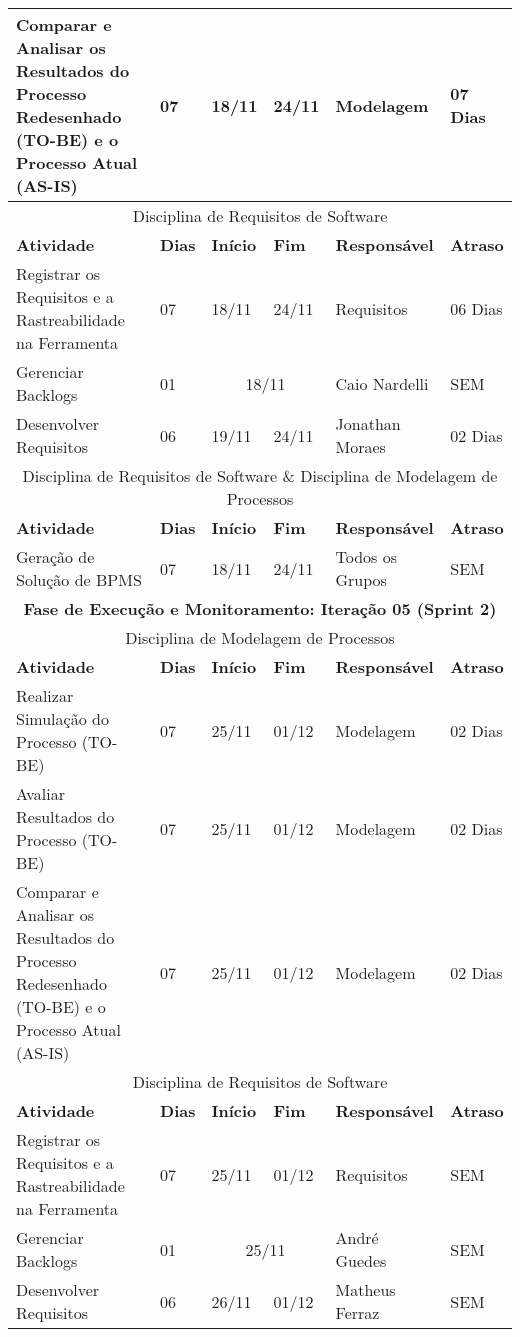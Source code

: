 \begin{center}
	\begin{tabular}{|m{10cm}|m{1cm}|m{1cm}|m{1cm}|m{4cm}|m{2cm}|}
	\hline
	Comparar e Analisar os Resultados do Processo Redesenhado (TO-BE) e o Processo Atual (AS-IS) & 07 & 18/11 & 24/11 & Modelagem & 07 Dias \\ \hline
	\multicolumn{6}{|c|}{Disciplina de Requisitos de Software} \\
	\hline
	\textbf{Atividade} & \textbf{Dias} & \textbf{Início} & \textbf{Fim} & \textbf{Responsável} & \textbf{Atraso} \\ \hline
	Registrar os Requisitos e a Rastreabilidade na Ferramenta & 07 & 18/11 & 24/11 & Requisitos & 06 Dias \\ \hline
	Gerenciar Backlogs & 01 & \multicolumn{2}{c|}{18/11} & Caio Nardelli & SEM \\ \hline
	Desenvolver Requisitos & 06 & 19/11 & 24/11 & Jonathan Moraes & 02 Dias \\ \hline
	\multicolumn{6}{|c|}{Disciplina de Requisitos de Software \& Disciplina de Modelagem de Processos} \\ \hline
	\textbf{Atividade} & \textbf{Dias} & \textbf{Início} & \textbf{Fim} & \textbf{Responsável} & \textbf{Atraso} \\ \hline
	Geração de Solução de BPMS & 07 & 18/11 & 24/11 & Todos os Grupos & SEM \\ \hline
	\multicolumn{6}{|c|}{\textbf{Fase de Execução e Monitoramento: Iteração 05 (Sprint 2)}} \\
	\hline
	\multicolumn{6}{|c|}{Disciplina de Modelagem de Processos} \\
	\hline
	\textbf{Atividade} & \textbf{Dias} & \textbf{Início} & \textbf{Fim} & \textbf{Responsável} & \textbf{Atraso} \\ \hline
	Realizar Simulação do Processo (TO-BE) & 07 & 25/11 & 01/12 & Modelagem & 02 Dias \\ \hline
	Avaliar Resultados do Processo (TO-BE) & 07 & 25/11 & 01/12 & Modelagem & 02 Dias \\ \hline
	Comparar e Analisar os Resultados do Processo Redesenhado (TO-BE) e o Processo Atual (AS-IS) & 07 & 25/11 & 01/12 & Modelagem & 02 Dias \\ \hline
	\multicolumn{6}{|c|}{Disciplina de Requisitos de Software} \\
	\hline
	\textbf{Atividade} & \textbf{Dias} & \textbf{Início} & \textbf{Fim} & \textbf{Responsável} & \textbf{Atraso} \\ \hline
	Registrar os Requisitos e a Rastreabilidade na Ferramenta & 07 & 25/11 & 01/12 & Requisitos & SEM \\ \hline
	Gerenciar Backlogs & 01 & \multicolumn{2}{c|}{25/11} & André Guedes & SEM \\ \hline
	Desenvolver Requisitos & 06 & 26/11 & 01/12 & Matheus Ferraz & SEM \\ \hline
	\end{tabular}
\end{center}
